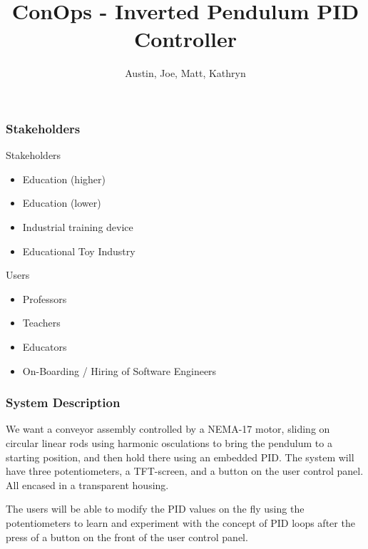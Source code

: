 \documentclass[aspectratio=169]{beamer}
\title{ConOps - Inverted Pendulum PID Controller}       %
\author{Austin, Joe, Matt, Kathryn}                     %
\institute{SNHU/CETA}                                   %
\begin{document}
\frame{\titlepage} %


\begin{frame}                     %
    \frametitle{Stakeholders}     %

    \begin{block}{Stakeholders}   %
        \begin{itemize}           %
            \item Education (higher)
            \item Education (lower)
            \item Industrial training device
            \item Educational Toy Industry
        \end{itemize}
    \end{block}

    \begin{block}{Users}
        \begin{itemize}
            \item Professors
            \item Teachers
            \item Educators
            \item On-Boarding / Hiring of Software Engineers
        \end{itemize}
    \end{block}

\end{frame}


\begin{frame}
    \frametitle{System Description}

    We want a conveyor assembly controlled by a NEMA-17 motor, sliding on circular linear rods
    using harmonic osculations to bring the pendulum to a starting position, and then hold there
    using an embedded PID. The system will have three potentiometers, a TFT-screen, and a button on the user control panel. All encased in a transparent housing.

    \begin{block}{}
        The users will be able to modify the PID values on the fly using the potentiometers to learn and experiment
        with the concept of PID loops after the press of a button on the front of the user control panel.
    \end{block}

\end{frame}
\end{document}
